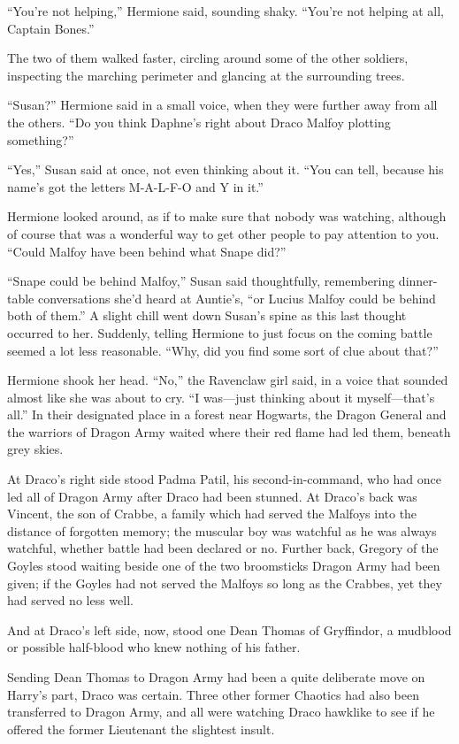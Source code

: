 “You’re not helping,” Hermione said, sounding shaky. “You’re not helping at
all, Captain Bones.”

The two of them walked faster, circling around some of the other soldiers,
inspecting the marching perimeter and glancing at the surrounding trees.

“Susan?” Hermione said in a small voice, when they were further away from
all the others. “Do you think Daphne’s right about Draco Malfoy plotting
something?”

“Yes,” Susan said at once, not even thinking about it. “You can tell, because
his name’s got the letters M-A-L-F-O and Y in it.”

Hermione looked around, as if to make sure that nobody was watching, although
of course that was a wonderful way to get other people to pay attention to you.
“Could Malfoy have been behind what Snape did?”

“Snape could be behind Malfoy,” Susan said thoughtfully, remembering
dinner-table conversations she’d heard at Auntie’s, “or Lucius Malfoy could be
behind both of them.” A slight chill went down Susan’s spine as this last
thought occurred to her. Suddenly, telling Hermione to just focus on the coming
battle seemed a lot less reasonable. “Why, did you find some sort of clue about
that?”

Hermione shook her head. “No,” the Ravenclaw girl said, in a voice that sounded
almost like she was about to cry. “I was—just thinking about it
myself—that’s all.”
\later
In their designated place in a forest near Hogwarts, the Dragon General and the
warriors of Dragon Army waited where their red flame had led them, beneath grey
skies.

At Draco’s right side stood Padma Patil, his second-in-command, who had once
led all of Dragon Army after Draco had been stunned. At Draco’s back was
Vincent, the son of Crabbe, a family which had served the Malfoys into the
distance of forgotten memory; the muscular boy was watchful as he was always
watchful, whether battle had been declared or no. Further back, Gregory of the
Goyles stood waiting beside one of the two broomsticks Dragon Army had been
given; if the Goyles had not served the Malfoys so long as the Crabbes, yet
they had served no less well.

And at Draco’s left side, now, stood one Dean Thomas of Gryffindor, a mudblood
or possible half-blood who knew nothing of his father.

Sending Dean Thomas to Dragon Army had been a quite deliberate move on Harry’s
part, Draco was certain. Three other former Chaotics had also been transferred
to Dragon Army, and all were watching Draco hawklike to see if he offered the
former Lieutenant the slightest insult.

